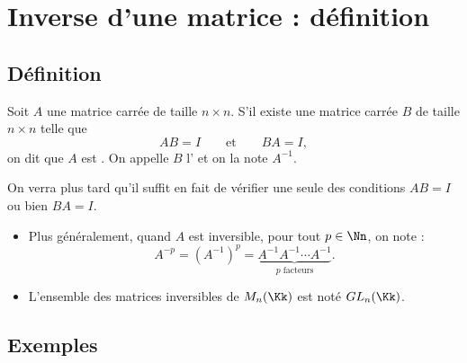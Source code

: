 \documentclass[class=report,crop=false]{standalone}
\begin{document}
\section{Inverse d'une matrice : définition}

\subsection{Définition}


\begin{definition}
Soit $A$ une matrice  carrée de taille $n \times n$. S'il existe une matrice carrée
$B$ de taille $n \times n$ telle que
 $$ AB = I\qquad \text{et} \qquad BA = I, $$
 on dit que $A$ est . On appelle $B$ l'
 et on la note $A^{-1}$.
\end{definition}

On verra plus tard qu'il suffit en fait de vérifier une seule des
conditions $AB=I$ ou bien $BA=I$.


\bigskip

\begin{itemize}
  \item Plus généralement, quand $A$ est inversible, pour tout $p\in \Nn$, on note :
$$A^{-p}=(A^{-1})^p = \underbrace{A^{-1} A^{-1} \cdots A^{-1}}_{{p \text{ facteurs}}}.$$


  \item L'ensemble des matrices inversibles de $M_{n}(\Kk)$ est noté
$GL_{n}(\Kk)$.
\end{itemize}


\subsection{Exemples}
\end{document}
